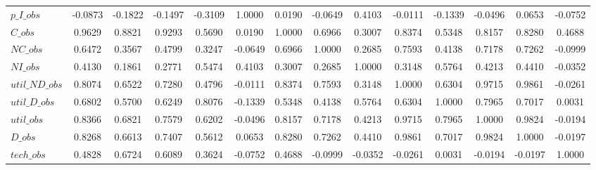\begin{center}
\begin{longtable}{lccccccccccccc}
$p\_I\_obs      $	 & 	          -0.0873	 & 	          -0.1822	 & 	          -0.1497	 & 	          -0.3109	 & 	           1.0000	 & 	           0.0190	 & 	          -0.0649	 & 	           0.4103	 & 	          -0.0111	 & 	          -0.1339	 & 	          -0.0496	 & 	           0.0653	 & 	          -0.0752 \\ 
$C\_obs         $	 & 	           0.9629	 & 	           0.8821	 & 	           0.9293	 & 	           0.5690	 & 	           0.0190	 & 	           1.0000	 & 	           0.6966	 & 	           0.3007	 & 	           0.8374	 & 	           0.5348	 & 	           0.8157	 & 	           0.8280	 & 	           0.4688 \\ 
$NC\_obs        $	 & 	           0.6472	 & 	           0.3567	 & 	           0.4799	 & 	           0.3247	 & 	          -0.0649	 & 	           0.6966	 & 	           1.0000	 & 	           0.2685	 & 	           0.7593	 & 	           0.4138	 & 	           0.7178	 & 	           0.7262	 & 	          -0.0999 \\ 
$NI\_obs        $	 & 	           0.4130	 & 	           0.1861	 & 	           0.2771	 & 	           0.5474	 & 	           0.4103	 & 	           0.3007	 & 	           0.2685	 & 	           1.0000	 & 	           0.3148	 & 	           0.5764	 & 	           0.4213	 & 	           0.4410	 & 	          -0.0352 \\ 
$util\_ND\_obs  $	 & 	           0.8074	 & 	           0.6522	 & 	           0.7280	 & 	           0.4796	 & 	          -0.0111	 & 	           0.8374	 & 	           0.7593	 & 	           0.3148	 & 	           1.0000	 & 	           0.6304	 & 	           0.9715	 & 	           0.9861	 & 	          -0.0261 \\ 
$util\_D\_obs   $	 & 	           0.6802	 & 	           0.5700	 & 	           0.6249	 & 	           0.8076	 & 	          -0.1339	 & 	           0.5348	 & 	           0.4138	 & 	           0.5764	 & 	           0.6304	 & 	           1.0000	 & 	           0.7965	 & 	           0.7017	 & 	           0.0031 \\ 
$util\_obs      $	 & 	           0.8366	 & 	           0.6821	 & 	           0.7579	 & 	           0.6202	 & 	          -0.0496	 & 	           0.8157	 & 	           0.7178	 & 	           0.4213	 & 	           0.9715	 & 	           0.7965	 & 	           1.0000	 & 	           0.9824	 & 	          -0.0194 \\ 
$D\_obs         $	 & 	           0.8268	 & 	           0.6613	 & 	           0.7407	 & 	           0.5612	 & 	           0.0653	 & 	           0.8280	 & 	           0.7262	 & 	           0.4410	 & 	           0.9861	 & 	           0.7017	 & 	           0.9824	 & 	           1.0000	 & 	          -0.0197 \\ 
$tech\_obs      $	 & 	           0.4828	 & 	           0.6724	 & 	           0.6089	 & 	           0.3624	 & 	          -0.0752	 & 	           0.4688	 & 	          -0.0999	 & 	          -0.0352	 & 	          -0.0261	 & 	           0.0031	 & 	          -0.0194	 & 	          -0.0197	 & 	           1.0000 \\ 
\end{longtable}
 \end{center}
